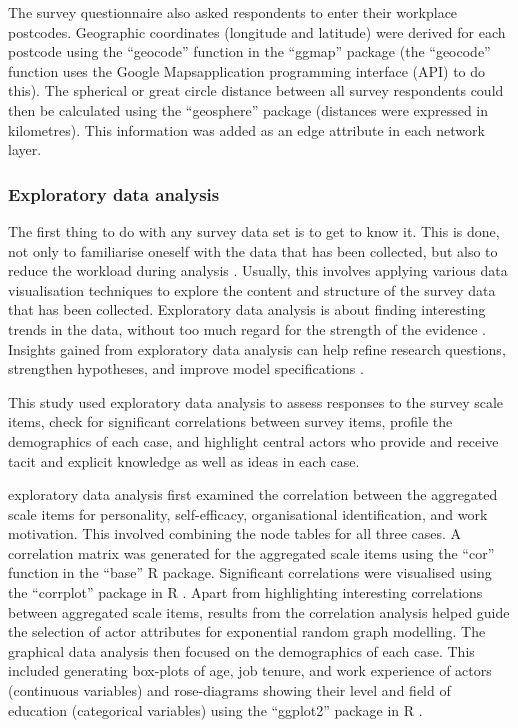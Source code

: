 The survey questionnaire also asked respondents to enter their workplace postcodes. Geographic coordinates (longitude and latitude) were derived for each postcode using the \enquote{geocode} function in the \enquote{ggmap} package (the \enquote{geocode} function uses the Google Maps\texttrademark application programming interface (API) to do this). The spherical or great circle distance between all survey respondents could then be calculated using the \enquote{geosphere} package (distances were expressed in kilometres). This information was added as an edge attribute in each network layer. \medskip

\subsubsection{Exploratory data analysis}

The first thing to do with any survey data set is to get to know it. This is done, not only to familiarise oneself with the data that has been collected, but also to reduce the workload during analysis \citep{cox2017translating}. Usually, this involves applying various data visualisation techniques to explore the content and structure of the survey data that has been collected. Exploratory data analysis is about finding interesting trends in the data, without too much regard for the strength of the evidence \citep{morgenthaler2009exploratory}. Insights gained from exploratory data analysis can help refine research questions, strengthen hypotheses, and improve model specifications \citep{jebb2017exploratory}. \medskip    

This study used exploratory data analysis to assess responses to the survey scale items, check for significant correlations between survey items, profile the demographics of each case, and highlight central actors who provide and receive tacit and explicit knowledge as well as ideas in each case.  

exploratory data analysis first examined the correlation between the aggregated scale items for personality, self-efficacy, organisational identification, and work motivation. This involved combining the node tables for all three cases. A correlation matrix was generated for the aggregated scale items using the \enquote{cor} function in the \enquote{base} R package. Significant correlations were visualised using the \enquote{corrplot} package in R \citep{wei2017corrplot}. Apart from highlighting interesting correlations between aggregated scale items, results from the correlation analysis helped guide the selection of actor attributes for exponential random graph modelling. The graphical data analysis then focused on the demographics of each case. This included generating box-plots of age, job tenure, and work experience of actors (continuous variables) and rose-diagrams showing their level and field of education (categorical variables) using the \enquote{ggplot2} package in R \citep{wickham2016ggplot2}. \medskip

